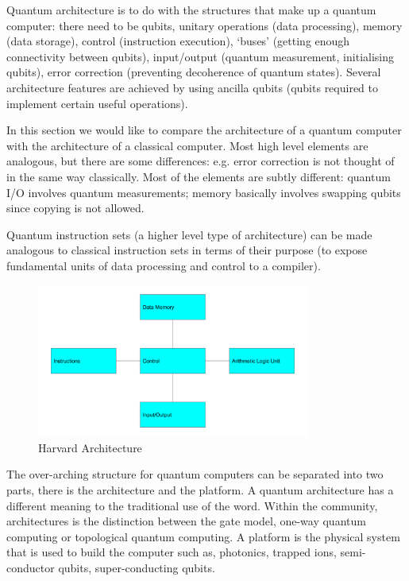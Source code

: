 Quantum architecture is to do with the structures that make up a quantum computer: there need to be qubits, unitary operations (data processing), memory (data storage), control (instruction execution), `buses' (getting enough connectivity between qubits), input/output (quantum measurement, initialising qubits), error correction (preventing decoherence of quantum states). Several architecture features are achieved by using ancilla qubits (qubits required to implement certain useful operations). 

In this section we would like to compare the architecture of a quantum computer with the architecture of a classical computer. Most high level elements are analogous, but there are some differences: e.g. error correction is not thought of in the same way classically. Most of the elements are subtly different: quantum I/O involves quantum measurements; memory basically involves swapping qubits since copying is not allowed.

Quantum instruction sets (a higher level type of architecture) can be made analogous to classical instruction sets in terms of their purpose (to expose fundamental units of data processing and control to a compiler).

\begin{figure}[H]
    \centering
    \includegraphics[width=0.8\textwidth]{figures/impl/harvardarch.png}
    \caption{Harvard Architecture}
    \label{fig:cpuHarvArch}
\end{figure}

The over-arching structure for quantum computers can be separated into two parts, there is the architecture and the platform. A quantum architecture has a different meaning to the traditional use of the word. Within the community, architectures is the distinction between the gate model, one-way quantum computing or topological quantum computing. A platform is the physical system that is used to build the computer such as, photonics, trapped ions, semi-conductor qubits, super-conducting qubits. 


